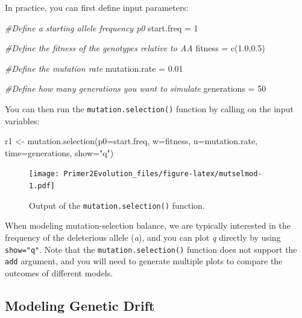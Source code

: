 \documentclass[
]{book}
\newenvironment{Shaded}{\begin{snugshade}}{\end{snugshade}}
\newcommand{\AttributeTok}[1]{\textcolor[rgb]{0.77,0.63,0.00}{#1}}
\newcommand{\CommentTok}[1]{\textcolor[rgb]{0.56,0.35,0.01}{\textit{#1}}}
\newcommand{\DecValTok}[1]{\textcolor[rgb]{0.00,0.00,0.81}{#1}}
\newcommand{\FloatTok}[1]{\textcolor[rgb]{0.00,0.00,0.81}{#1}}
\newcommand{\FunctionTok}[1]{\textcolor[rgb]{0.00,0.00,0.00}{#1}}
\newcommand{\NormalTok}[1]{#1}
\newcommand{\OtherTok}[1]{\textcolor[rgb]{0.56,0.35,0.01}{#1}}
\newcommand{\StringTok}[1]{\textcolor[rgb]{0.31,0.60,0.02}{#1}}
\begin{document}
In practice, you can first define input parameters:

\begin{Shaded}
\begin{Highlighting}[]
\CommentTok{\#Define a starting allele frequency p0}
\NormalTok{start.freq }\OtherTok{=} \DecValTok{1}

\CommentTok{\#Define the fitness of the genotypes relative to AA}
\NormalTok{fitness }\OtherTok{=} \FunctionTok{c}\NormalTok{(}\FloatTok{1.0}\NormalTok{,}\FloatTok{0.5}\NormalTok{)}

\CommentTok{\#Define the mutation rate}
\NormalTok{mutation.rate }\OtherTok{=} \FloatTok{0.01}

\CommentTok{\#Define how many generations you want to simulate}
\NormalTok{generations }\OtherTok{=} \DecValTok{50}
\end{Highlighting}
\end{Shaded}

You can then run the \texttt{mutation.selection()} function by calling on the input variables:

\begin{Shaded}
\begin{Highlighting}[]
\NormalTok{r1 }\OtherTok{\textless{}{-}} \FunctionTok{mutation.selection}\NormalTok{(}\AttributeTok{p0=}\NormalTok{start.freq, }\AttributeTok{w=}\NormalTok{fitness, }\AttributeTok{u=}\NormalTok{mutation.rate, }\AttributeTok{time=}\NormalTok{generations, }\AttributeTok{show=}\StringTok{"q"}\NormalTok{)}
\end{Highlighting}
\end{Shaded}

\begin{figure}
\centering
\texttt{[image: Primer2Evolution\_files/figure-latex/mutselmod-1.pdf]}
\caption{\label{fig:mutselmod}Output of the \texttt{mutation.selection()} function.}
\end{figure}

When modeling mutation-selection balance, we are typically interested in the frequency of the deleterious allele (\emph{a}), and you can plot \emph{q} directly by using \texttt{show="q"}. Note that the \texttt{mutation.selection()} function does not support the \texttt{add} argument, and you will need to generate multiple plots to compare the outcomes of different models.

\hypertarget{modeling-genetic-drift}{%
\subsection{Modeling Genetic Drift}\label{modeling-genetic-drift}}
\end{document}

